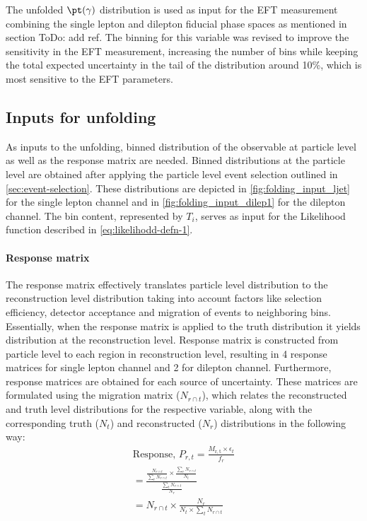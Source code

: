 The unfolded $\pt(\gamma)$ distribution is used as input for the EFT measurement combining the single lepton and dilepton fiducial phase spaces as mentioned in section {ToDo: add ref}. The binning for this variable was revised to improve the sensitivity in the EFT measurement, increasing the number of bins while keeping the total expected uncertainty in the tail of the distribution around 10\%, which is most sensitive to the EFT parameters.  



\subsection{Inputs for unfolding}
\label{sec:inputs-for-unfolding}
As inputs to the unfolding, binned distribution of the observable at particle level as well as the response matrix are needed. Binned distributions at the particle level are obtained after applying the particle level event selection outlined in \cref{sec:event-selection}. These distributions are depicted in \cref{fig:folding_input_ljet} for the single lepton channel and in \cref{fig:folding_input_dilep1} for the dilepton channel. The bin content, represented by $T_{i}$, serves as input for the Likelihood function described in \cref{eq:likelihodd-defn-1}.

\paragraph{Response matrix} The response matrix effectively translates particle level distribution to the reconstruction level distribution taking into account factors like selection efficiency, detector acceptance and migration of events to neighboring bins. Essentially, when the response matrix is applied to the truth distribution it yields distribution at the reconstruction level. Response matrix is constructed from particle level to each region in reconstruction level, resulting in 4 response matrices for single lepton channel and 2 for dilepton channel. Furthermore, response matrices are obtained for each source of uncertainty. These matrices are formulated using the migration matrix ($N_{r \cap t}$), which relates the reconstructed and truth level distributions for the respective variable, along with the corresponding truth ($N_{t}$) and reconstructed ($N_{r}$) distributions in the following way:
\begin{align}
    \text{Response, } P_{r,t} = \frac{M_{\mathrm{r,t}} \times \epsilon_{t}}{f_{r}}\\
    = \frac{\frac{N_{r \cap t}}{\sum_{r} N_{r \cap t}} \times \frac{\sum_{r} N_{r \cap t}}{N_{t}}}{\frac{\sum_{t} N_{r \cap t}}{N_{r}}}\\
    = N_{r \cap t} \times \frac{N_{r}}{N_{t}\times \sum_{t} N_{r \cap t}}
\end{align}

